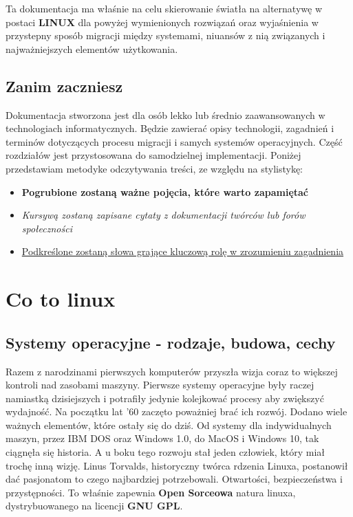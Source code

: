 \documentclass[10pt,a4paper]{report}
\begin{document}
Ta dokumentacja ma właśnie na celu skierowanie światła na alternatywę w postaci \textbf{LINUX} dla powyżej wymienionych rozwiązań oraz wyjaśnienia w przystepny sposób migracji między systemami, niuansów z nią związanych i najważniejszych elementów użytkowania.
	
	\section{Zanim zaczniesz}
	
Dokumentacja stworzona jest dla osób lekko lub średnio zaawansowanych w technologiach informatycznych. Będzie zawierać opisy technologii, zagadnień i terminów dotyczących procesu migracji i samych systemów operacyjnych. Część rozdziałów jest przystosowana do samodzielnej implementacji. Poniżej przedstawiam metodyke odczytywania treści, ze względu na stylistykę:
\begin{itemize}
\item \textbf{Pogrubione zostaną ważne pojęcia, które warto zapamiętać}
\item \textsl{Kursywą zostaną zapisane cytaty z dokumentacji twórców lub forów społeczności}
\item \underline{Podkreślone zostaną słowa grające kluczową rolę w zrozumieniu zagadnienia}
\end{itemize}


\tableofcontents
\newpage

\chapter{Co to linux}

	\section{Systemy operacyjne - rodzaje, budowa, cechy}

Razem z narodzinami pierwszych komputerów przyszła wizja coraz to większej kontroli nad zasobami maszyny. Pierwsze systemy operacyjne były raczej namiastką dzisiejszych i potrafiły jedynie kolejkować procesy aby zwiększyć wydajność. Na początku lat '60 zaczęto poważniej brać ich rozwój. Dodano wiele ważnych elementów, które ostały się do dziś. Od systemy dla indywidualnych maszyn, przez IBM DOS oraz Windows 1.0, do MacOS i Windows 10, tak ciągnęła się historia. A u boku tego rozwoju stał jeden człowiek, który miał trochę inną wizję. Linus Torvalds, historyczny twórca rdzenia Linuxa, postanowił dać pasjonatom to czego najbardziej potrzebowali. Otwartości, bezpieczeństwa i przystępności. To właśnie zapewnia \textbf{Open Sorceowa} natura linuxa, dystrybuowanego na licencji \textbf{GNU GPL}.\\
\end{document}
